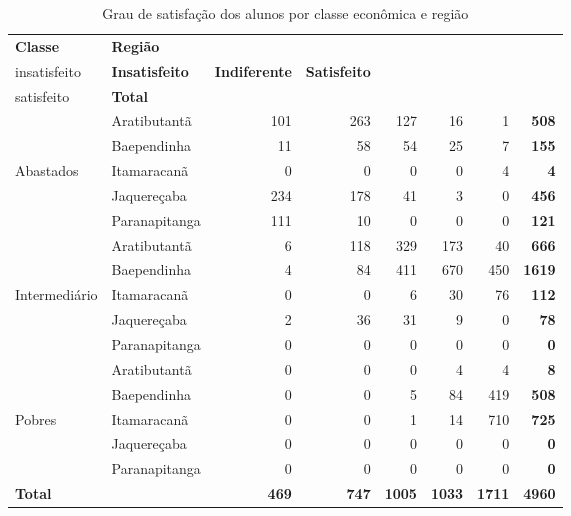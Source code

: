 \begin{table}[h]
\footnotesize
\centering
\caption{Grau de satisfação dos alunos por classe econômica e região}
\label{tabela:q16}
\vspace{0.5em}
\begin{tabular}{ll rrrrrr}
  \toprule
 \textbf{Classe}    & \textbf{Região}  & \textbf{\specialcell{c}{Muito\\insatisfeito}} & \textbf{Insatisfeito} & \textbf{Indiferente} & \textbf{Satisfeito} & \textbf{\specialcell{c}{Muito\\satisfeito}} & \textbf{Total} \\ 
   \midrule
					& Aratibutantã  & 101 & 263 & 127 &  16 &   1 & \textbf{508}\\%
					& Baependinha   &  11 &  58 &  54 &  25 &   7 & \textbf{155}\\ 
	Abastados		& Itamaracanã   &   0 &   0 &   0 &   0 &   4 & \textbf{4}\\ 
					& Jaquereçaba   & 234 &  178 & 41 &   3 &   0 & \textbf{456}\\ 
					& Paranapitanga & 111 &   10 &  0 &   0 &   0 & \textbf{121}\\ 
\midrule
					& Aratibutantã  &   6 & 118 & 329 & 173 &  40 & \textbf{666}\\ 
					& Baependinha   &   4 &  84 & 411 & 670 & 450 & \textbf{1619}\\ 
	Intermediário 	& Itamaracanã   &   0 &   0 &   6 &  30 &  76 & \textbf{112}\\ 
					& Jaquereçaba   &   2 &  36 &  31 &   9 &   0 & \textbf{78}\\ 
					& Paranapitanga &   0 &   0 &   0 &   0 &   0 & \textbf{0}\\ 
\midrule
					& Aratibutantã  &   0 &   0 &   0 &   4 &   4 & \textbf{8}\\ 
					& Baependinha   &   0 &   0 &   5 &  84 & 419 & \textbf{508}\\ 
	Pobres        	& Itamaracanã   &   0 &   0 &   1 &  14 & 710 & \textbf{725}\\ 
					& Jaquereçaba   &   0 &   0 &   0 &   0 &   0 & \textbf{0}\\ 
					& Paranapitanga &   0 &   0 &   0 &   0 &   0 & \textbf{0}\\ 
\midrule
\textbf{Total}	   &&\textbf{469} & \textbf{747} & \textbf{1005}& \textbf{1033}& \textbf{1711}&\textbf{4960}\\  
	\bottomrule
\end{tabular}
\end{table}

